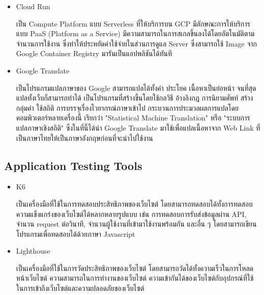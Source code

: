 \documentclass[12pt,oneside,openright,a4paper]{cpe-thai-project}
\begin{document}
\begin{itemize}
      \item Cloud Run
      
      \hspace{1cm}เป็น Compute Platform แบบ Serverless ที่ให้บริการบน GCP มีลักษณะการให้บริการแบบ PaaS (Platform as a Service) 
      มีความสามารถในการสเกลขึ้นลงได้โดยอัตโนมัติตามจำนวนการใช้งาน 
      ซึ่งทำให้ประหยัดค่าใช้จ่ายในส่วนการดูแล Server ซึ่งสามารถใช้ Image จาก Google Container Registry มารันเป็นแอปพลิชันได้ทันที \cite{cloud_run}

      \item Google Translate
      
      \hspace{1cm}เป็นโปรแกรมแปลภาษาของ Google สามารถแปลได้ทั้งคำ ประโยค เนื้อหาเป็นย่อหน้า จนที่สุดแปลทั้งเว็บก็สามารถทำได้
      เป็นโปรแกรมที่สร้างขึ้นโดยใช้กลวิธี อ้างอิงกฎ การนิยามศัพท์ สร้างกลุ่มคำ ใช้สถิติ การบรรจุเรื่องไวยากรณ์ภาษาเข้าไป 
      กระบวนการประมวลผลการแปลโดยคอมพิวเตอร์หลายเครื่องนี้ เรียกว่า "Statistical Machine Translation" หรือ "ระบบการแปลภาษาเชิงสถิติ" \cite{gg_tran}
      ซึ่งในที่นี้ได้นำ Google Translate มาใช้เพื่อแปลเนื้อหาจาก Web Link ที่เป็นภาษาไทยให้เป็นภาษาอังกฤษก่อนที่จะนำไปใช้งาน
    \end{itemize}

  \subsection{Application Testing Tools}
    \begin{itemize}
      \item K6
      
        \hspace{1cm}เป็นเครื่องมือที่ใช้ในการทดสอบประสิทธิภาพของเว็บไซต์ โดยสามารถทดสอบได้ทั้งการทดสอบความแข็งแกร่งของเว็บไซต์ได้หลากหลายรูปแบบ เช่น 
        การทดสอบการรับส่งข้อมูลผ่าน API, จำนวน request ต่อวินาที, จำนวนผู้ใช้งานที่เข้ามาใช้งานพร้อมกัน และอื่น ๆ โดยสามารถเขียนโปรแกรมเพื่อทดสอบได้ด้วยภาษา Javascript \cite{k6}

      \item Lighthouse

        \hspace{1cm}เป็นเครื่องมือที่ใช้ในการวัดประสิทธิภาพของเว็บไซต์ โดยสามารถวัดได้ทั้งความเร็วในการโหลดหน้าเว็บไซต์ ความสามารถในการทำงานของเว็บไซต์ 
        ความเข้ากันได้ของเว็บไซต์กับอุปกรณ์ที่ใช้ในการเข้าถึงเว็บไซต์และความปลอดภัยของเว็บไซต์ \cite{lighthouse}
    \end{itemize}
\end{document}
